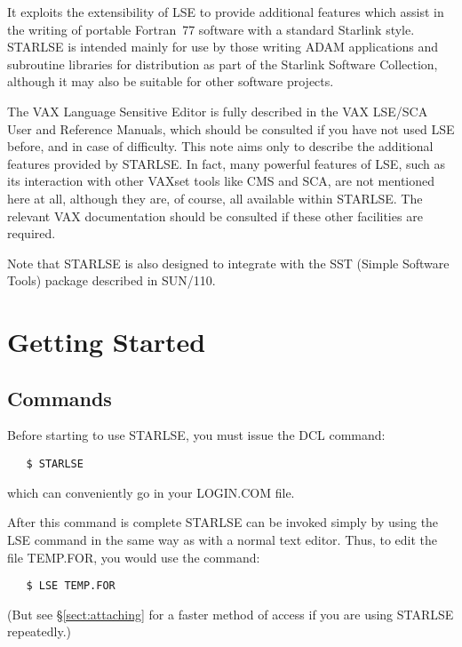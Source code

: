 It exploits the extensibility of \mbox{LSE} to provide additional features which
assist in the writing of portable Fortran~77 software with a standard Starlink
style.
\mbox{STARLSE} is intended mainly for use by those writing \mbox{ADAM}
applications and subroutine libraries for distribution as part of the Starlink
Software Collection, although it may also be suitable for other software
projects.

The \mbox{VAX} Language Sensitive Editor is fully described in the
\mbox{VAX} \mbox{LSE/SCA} User and Reference Manuals, which should be
consulted if you have not used \mbox{LSE} before, and in case of difficulty.
This note aims only to describe the additional features provided by
\mbox{STARLSE}.
In fact, many powerful features of \mbox{LSE}, such as its interaction with
other VAXset tools like \mbox{CMS} and \mbox{SCA}, are not mentioned here at
all, although they are, of course, all available within \mbox{STARLSE}.
The relevant \mbox{VAX} documentation should be consulted if these other
facilities are required.

Note that STARLSE is also designed to integrate with the SST (Simple
Software Tools) package described in SUN/110.


\section{Getting Started}

\subsection{Commands}
\label{sect:starting}
Before starting to use \mbox{STARLSE}, you must issue the DCL command:

\begin{verbatim}
   $ STARLSE
\end{verbatim}

which can conveniently go in your \mbox{LOGIN.COM} file.

After this command is complete \mbox{STARLSE} can be invoked simply by using the
\mbox{LSE} command in the same way as with a normal text editor. Thus, to edit
the file \mbox{TEMP.FOR}, you would use the command:

\begin{verbatim}
   $ LSE TEMP.FOR
\end{verbatim}

(But see \S\ref{sect:attaching} for a faster method of access if you are using
STARLSE repeatedly.)


